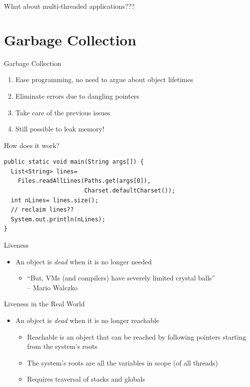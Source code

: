 \documentclass[
14pt,
aspectratio=169,
usenames,
dvipsnames,
x11names]{beamer}
\begin{document}
\begin{frame}
  \centering
  What about \alert{multi-threaded} applications???
\end{frame}

\section{Garbage Collection}

\begin{frame}{Garbage Collection}
  \begin{enumerate}  \setlength{\itemsep}{\fill}
  \item Ease programming, no need to argue about object lifetimes
  \item Eliminate errors due to dangling pointers
  \item Take care of the previous issues
  \item Still possible to leak memory!
  \end{enumerate}
\end{frame}

\begin{frame}[fragile]{How does it work?}
\begin{lstlisting}
public static void main(String args[]) {
  List<String> lines=
    Files.readAllLines(Paths.get(args[0]),
                       Charset.defaultCharset());
  int nLines= lines.size();
  // reclaim lines??
  System.out.println(nLines);
}
\end{lstlisting}
\end{frame}

\begin{frame}{Liveness}
  \begin{itemize}
  \item An object is \textit{dead} when it is \alert{no longer needed}
    \pause
    \begin{itemize}
    \item ``But, VMs (and compilers) have severely limited crystal balls''\\
      \hfill -- Mario Walczko
    \end{itemize}
  \end{itemize}
\end{frame}

\begin{frame}{Liveness in the Real World}
  \begin{itemize}
  \item An object is \textit{dead} when it is \alert{no longer reachable}
    \begin{itemize}  \setlength{\itemsep}{\fill}
    \item Reachable is an object that can be reached by following pointers starting from the system's roots
    \item The system's roots are all the variables in scope (of all threads)
    \item Requires traversal of stacks and globals
    \end{itemize}
  \end{itemize}
\end{frame}
\end{document}
